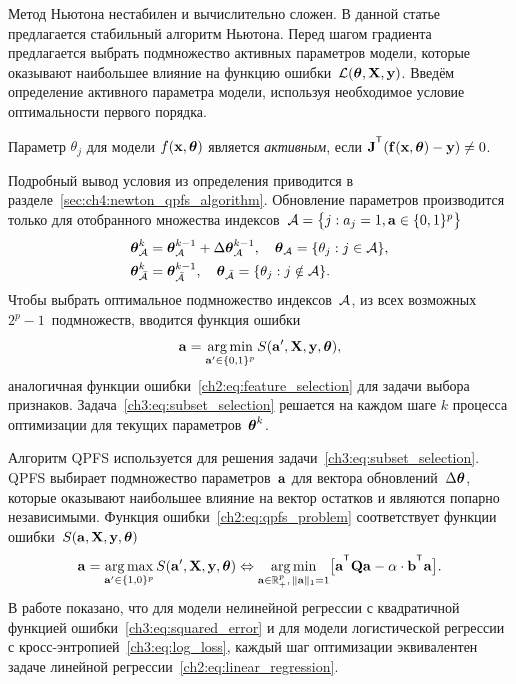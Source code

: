 Метод Ньютона нестабилен и вычислительно сложен. 
В данной статье предлагается стабильный алгоритм Ньютона. 
Перед шагом градиента предлагается выбрать подмножество активных параметров модели, которые оказывают наибольшее влияние на функцию ошибки~$\mathcal{L} (\boldsymbol{\theta}, \mathbf{X}, \mathbf{y})$.
Введём определение активного параметра модели, используя необходимое условие оптимальности первого порядка.
\begin{definition}
	\label{ch4:def:active_param}
	Параметр $\theta_j$ для модели $f(\mathbf{x}, \boldsymbol{\theta})$ является \textit{активным}, если $\bJ^{\T} (\mathbf{f}(\bx, \btheta) - \by) \neq 0$.
\end{definition}
Подробный вывод условия из определения приводится в разделе~\ref{sec:ch4:newton_qpfs_algorithm}.
Обновление параметров производится только для отобранного множества индексов~$\mathcal{A} = \bigl\{j: a_j = 1, \mathbf{a} \in \{0, 1\}^p\bigr\}$
\begin{align*}
\boldsymbol{\theta}_{\mathcal{A}}^k &= \boldsymbol{\theta}_{\mathcal{A}}^{k - 1} + \Delta \boldsymbol{\theta}_{\mathcal{A}}^{k - 1}, \quad \boldsymbol{\theta}_{\mathcal{A}} = \{\theta_j: j \in \mathcal{A} \}, \\
\boldsymbol{\theta}_{\bar{\mathcal{A}}}^k &= \boldsymbol{\theta}_{\bar{\mathcal{A}}}^{k - 1}, \quad \boldsymbol{\theta}_{\bar{\mathcal{A}}} = \{\theta_j: j \notin \mathcal{A} \}.
\end{align*}
Чтобы выбрать оптимальное подмножество индексов~$\mathcal{A}$, из всех возможных $2^p - 1$~подмножеств, вводится функция ошибки
\begin{equation}
\mathbf{a} = \mathop{\arg \min}\limits_{\mathbf{a}' \in \{0, 1\}^p} S(\mathbf{a}', \mathbf{X}, \mathbf{y}, \boldsymbol{\theta}),
\label{ch3:eq:subset_selection}
\end{equation}
аналогичная функции ошибки~\eqref{ch2:eq:feature_selection} для задачи выбора признаков. 
Задача~\eqref{ch3:eq:subset_selection} решается на каждом шаге $k$ процесса оптимизации для текущих параметров~$\boldsymbol{\theta}^k$.

Алгоритм QPFS используется для решения задачи~\eqref{ch3:eq:subset_selection}.
QPFS выбирает подмножество параметров~$\mathbf{a}$ для вектора обновлений~$ \Delta \boldsymbol{\theta}$, которые оказывают наибольшее влияние на вектор остатков и являются попарно независимыми.
Функция ошибки~\eqref{ch2:eq:qpfs_problem} соответствует функции ошибки~$S(\mathbf{a}, \mathbf{X}, \mathbf{y}, \boldsymbol{\theta})$
\begin{equation}
\ba = \argmax_{\ba' \in \{1, 0\}^p} S(\ba', \bX, \by, \btheta) \Leftrightarrow \argmin_{\ba  \in \bbR^p_+, \, \|\ba\|_1=1} \bigl[\ba^{\T} \bQ \ba - \alpha \cdot \mathbf{b}^{\T} \ba \bigr].
\end{equation}
В работе показано, что для модели нелинейной регрессии с квадратичной функцией ошибки~\eqref{ch3:eq:squared_error} и для модели логистической регрессии с кросс-энтропией~\eqref{ch3:eq:log_loss}, каждый шаг оптимизации эквивалентен задаче линейной регрессии~\eqref{ch2:eq:linear_regression}.

